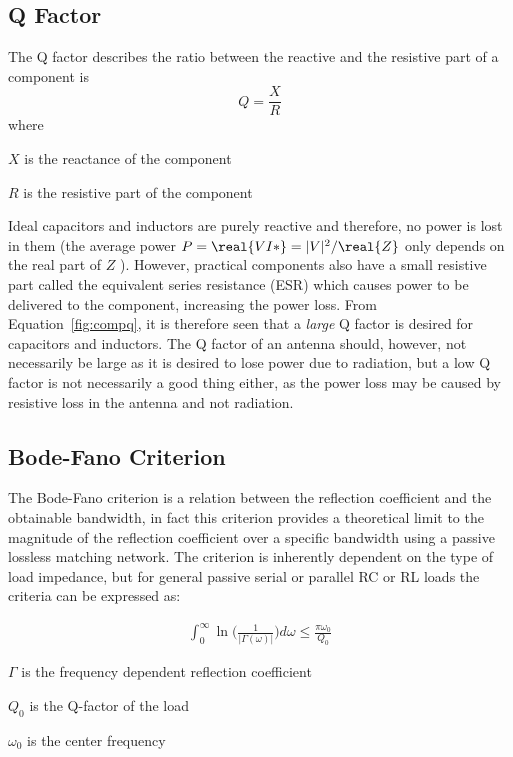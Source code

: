 \subsection{Q Factor}
The Q factor describes the ratio between the reactive and the resistive part of a component is \cite{pozar2011microwave}
\begin{equation}
    \label{fig:compq}
    Q = \frac{X}{R}
\end{equation}
where
\begin{where}
\item[$X$] is the reactance of the component
\item[$R$] is the resistive part of the component
\end{where}
Ideal capacitors and inductors are purely reactive and therefore, no power is lost in them (the average power $P = \real{VI*} = |V|^2 / \real{Z}$ only depends on the real part of $Z$ \cite{irwin2011engineering}). However, practical components also have a small resistive part called the equivalent series resistance (ESR) which causes power to be delivered to the component, increasing the power loss. From Equation~\ref{fig:compq}, it is therefore seen that a \emph{large} Q factor is desired for capacitors and inductors. The Q factor of an antenna should, however, not necessarily be large as it is desired to lose power due to radiation, but a low Q factor is not necessarily a good thing either, as the power loss may be caused by resistive loss in the antenna and not radiation.

\subsection{Bode-Fano Criterion}
The Bode-Fano criterion is a relation between the reflection coefficient and the obtainable bandwidth, in fact this criterion provides a theoretical limit to the magnitude of the reflection coefficient over a specific bandwidth using a passive lossless matching network\cite{pozar2011microwave}. The criterion is inherently dependent on the type of load impedance, but for general passive serial or parallel RC or RL loads the criteria can be expressed as\cite{RahulSarpeshkarUltra}: 

\begin{align}
  \int_0^{\infty} \ln \Big( \frac{1}{|\Gamma (\omega)|} \Big) d\omega \leq \frac{\pi \omega_0}{Q_0}
\end{align}

\begin{where}
\item[$\Gamma$] is the frequency dependent reflection coefficient
\item[$Q_0$] is the Q-factor of the load
\item[$\omega_0$] is the center frequency
\end{where}

